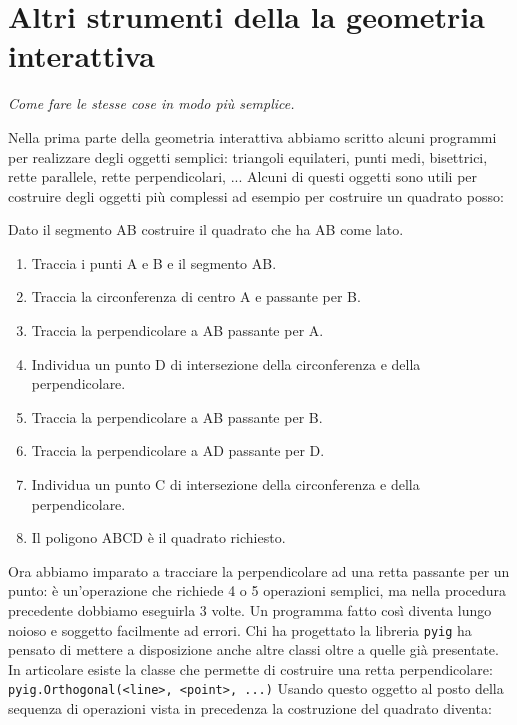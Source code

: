 \section{Altri strumenti della la geometria interattiva}
\label{sec:introduzione}

\emph{Come fare le stesse cose in modo più semplice.}

Nella prima parte della geometria interattiva abbiamo scritto alcuni programmi 
per realizzare degli oggetti semplici: triangoli equilateri, punti medi, 
bisettrici, rette parallele, rette perpendicolari, ...
Alcuni di questi oggetti sono utili per costruire degli oggetti più complessi 
ad esempio per costruire un quadrato posso:

\begin{procedura}[Quadrato]
 Dato il segmento AB costruire il quadrato che ha AB come lato.
  \begin{enumerate} [nosep]
    \item 
    Traccia i punti A e B e il segmento AB.
    \item 
    Traccia la circonferenza di centro A e passante per B.
    \item 
    Traccia la perpendicolare a AB passante per A.
    \item 
    Individua un punto D di intersezione della circonferenza e 
    della perpendicolare.
    \item 
    Traccia la perpendicolare a AB passante per B.
    \item 
    Traccia la perpendicolare a AD passante per D.
    \item 
    Individua un punto C di intersezione della circonferenza e 
    della perpendicolare.
    \item 
    Il poligono ABCD è il quadrato richiesto.    
  \end{enumerate}
\end{procedura}

Ora abbiamo imparato a tracciare la perpendicolare ad una retta passante per un 
punto: è un'operazione che richiede 4 o 5 operazioni semplici, ma nella 
procedura precedente dobbiamo eseguirla 3 volte. Un programma fatto così 
diventa lungo noioso e soggetto facilmente ad errori. Chi ha progettato la 
libreria \lstinline{pyig} ha pensato di mettere a disposizione anche altre 
classi oltre a quelle già presentate. In articolare esiste la classe che 
permette di costruire una retta perpendicolare: 
\lstinline{pyig.Orthogonal(<line>, <point>, ...)} 
Usando questo oggetto al posto della sequenza di operazioni vista in precedenza 
la costruzione del quadrato diventa:

